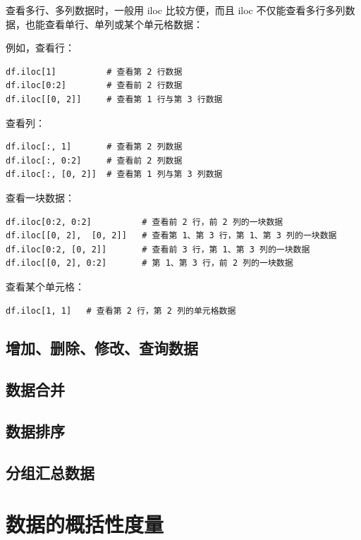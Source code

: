 查看多行、多列数据时，一般用 iloc 比较方便，而且 iloc 不仅能查看多行多列数据，也能查看单行、单列或某个单元格数据：

例如，查看行：

\begin{lstlisting}[Language=Python]
df.iloc[1]          # 查看第 2 行数据
df.iloc[0:2]        # 查看前 2 行数据
df.iloc[[0, 2]]     # 查看第 1 行与第 3 行数据
\end{lstlisting}

查看列：

\begin{lstlisting}[Language=Python]
df.iloc[:, 1]       # 查看第 2 列数据
df.iloc[:, 0:2]     # 查看前 2 列数据
df.iloc[:, [0, 2]]  # 查看第 1 列与第 3 列数据
\end{lstlisting}

查看一块数据：
\begin{lstlisting}[Language=Python]
df.iloc[0:2, 0:2]          # 查看前 2 行，前 2 列的一块数据
df.iloc[[0, 2],  [0, 2]]   # 查看第 1、第 3 行，第 1、第 3 列的一块数据
df.iloc[0:2, [0, 2]]       # 查看前 3 行，第 1、第 3 列的一块数据
df.iloc[[0, 2], 0:2]       # 第 1、第 3 行，前 2 列的一块数据
\end{lstlisting}

查看某个单元格：
\begin{lstlisting}[Language=Python]
df.iloc[1, 1]   # 查看第 2 行，第 2 列的单元格数据
\end{lstlisting}

\subsection{增加、删除、修改、查询数据}

\subsection{数据合并}

\subsection{数据排序}

\subsection{分组汇总数据}

\section{数据的概括性度量}
